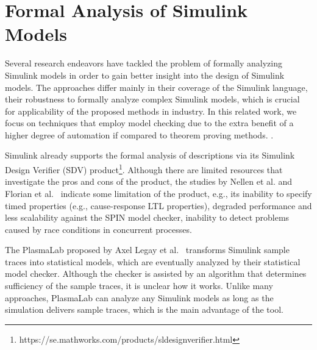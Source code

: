 \section{Formal Analysis of Simulink Models}
Several research endeavors have tackled the problem of formally analyzing Simulink models in order to gain better insight into the design of Simulink models. The approaches differ mainly in their coverage of the Simulink language, their robustness to formally analyze complex Simulink models, which is crucial for applicability of the proposed methods in industry. In this related work, we focus on techniques that employ model checking due to the extra benefit of a higher degree of automation if compared to theorem proving methods. .%

Simulink already supports the formal analysis of descriptions via its Simulink Design Verifier (SDV) product\footnote{https://se.mathworks.com/products/sldesignverifier.html}. Although there are limited resources that investigate the pros and cons of the product, the studies by Nellen et al. \cite{Nellen2018FormalRecommendations} and Florian et al.~\cite{Leitner2008SimulinkStudy} indicate some limitation of the product, e.g., its inability to specify timed properties (e.g., cause-response LTL properties), degraded performance and less scalability against the SPIN model checker, inability to detect problems caused by race conditions in concurrent processes. 

The PlasmaLab proposed by Axel Legay et al.~\cite{Legay2016StatisticalLab} transforms Simulink sample traces into statistical models, which are eventually analyzed by their statistical model checker. Although the checker is assisted by an algorithm that determines sufficiency of the sample traces, it is unclear how it works. Unlike many approaches, PlasmaLab can analyze any Simulink models as long as the simulation delivers sample traces, which is the main advantage of the tool.  %

